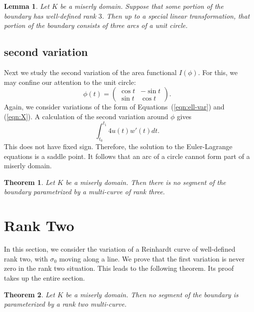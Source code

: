 \documentclass[11pt]{amsart}
\newtheorem{thm}{Theorem}
\newtheorem{lemma}{Lemma}
\begin{document}
\begin{lemma}  Let $K$ be a miserly domain.  Suppose that some portion of the boundary
has well-defined rank $3$.  Then up to a special linear transformation, that portion of the boundary
consists of three arcs of a unit circle.
\end{lemma}


\subsection{second variation}

Next we study the second variation of the area functional $I(\phi)$.  For this,
we may confine our attention to the unit circle:
$$
\phi(t) = \begin{pmatrix} \cos t & -\sin t \\ \sin t & \cos t
\end{pmatrix}.
$$
Again, we consider variations of the form of Equations~(\ref{eqn:ell-var}) and (\ref{eqn:X}).
A calculation of the second variation around $\phi$ gives
$$
\int_{t_0}^{t_1} 4 u(t) w'(t) dt.
$$
This does not have fixed sign.  Therefore, the solution to the Euler-Lagrange equations is a saddle point. 
It follows that an arc of a circle cannot form part of a miserly domain.

\begin{thm}  Let $K$ be a miserly domain.  Then there is no segment
of the boundary parametrized by a multi-curve of  rank  three.
\end{thm}


\section{Rank Two}

In this section, we consider the variation of a Reinhardt curve
of well-defined rank two, with $\sigma_0$ moving along a line.
We prove that the first variation is never zero in the rank two situation.  This leads to the following theorem.  Its proof takes up the entire section.

\begin{thm}  Let $K$ be a miserly domain.  Then no segment of the boundary is parameterized by a rank two multi-curve.
\end{thm}
\end{document}
